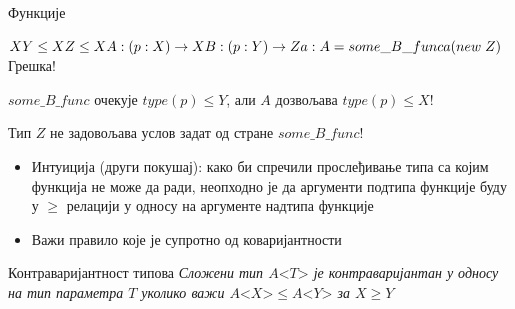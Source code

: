 \documentclass[xcolor=table]{beamer}
\begin{document}
\begin{frame}[allowframebreaks]{Функције}
        \framebreak
        
        \begin{math}
X 
\newline
Y \le X
\newline
Z \le X
\newline
A: (p: X) \to X
\newline
B: (p: Y) \to Z
\newline
\newline
a: A = some\_B\_func
\newline
a(new\;Z)
\newline
\newline
        \end{math}
Грешка!

\begin{math}some\_B\_func\end{math} очекује \begin{math}type(p) \leq Y\end{math}, али \begin{math}A\end{math} дозвољава \begin{math}type(p) \leq X\end{math}!

Тип \begin{math}Z\end{math} не задовољава услов задат од стране \begin{math}some\_B\_func\end{math}!
        \framebreak

        \begin{itemize}
            \item Интуиција (други покушај): како би спречили прослеђивање типа са којим функција не може да ради, неопходно је да аргументи подтипа функције буду у \begin{math}\geq\end{math} релацији у односу на аргументе надтипа функције
            \item Важи правило које је супротно од коваријантности
        \end{itemize}
    \end{frame}

    \begin{frame}{Контраваријантност типова}
    \textit{Сложени тип \begin{math}{A\mathord{<}T\mathord{>}}\end{math} је контраваријантан у односу на тип параметра \begin{math}T\end{math} уколико важи \begin{math}{A\mathord{<}X\mathord{>} \leq A\mathord{<}Y\mathord{>}}\end{math} за \begin{math}X \geq Y\end{math}}
    \end{frame}
\end{document}
